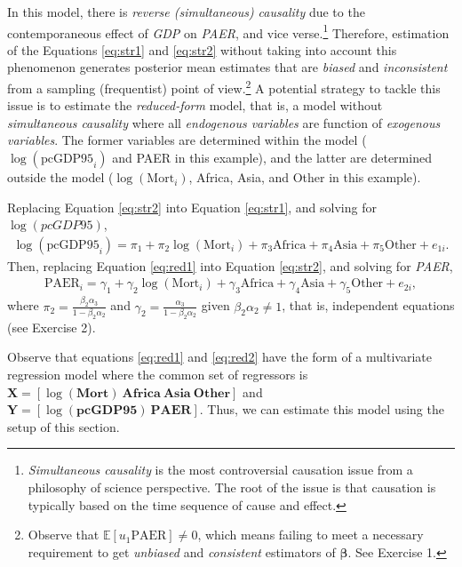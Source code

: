 In this model, there is \textit{reverse (simultaneous) causality} due to the contemporaneous effect of \textit{GDP} on \textit{PAER}, and vice verse.\footnote{\textit{Simultaneous causality} is the most controversial causation issue from a philosophy of science perspective. The root of the issue is that causation is typically based on the time sequence of cause and effect.} Therefore, estimation of the Equations \ref{eq:str1} and \ref{eq:str2} without taking into account this phenomenon generates posterior mean estimates that are \textit{biased} and \textit{inconsistent} from a sampling (frequentist) point of view.\footnote{Observe that $\mathbb{E}[u_1\text{PAER}]\neq 0$, which means failing to meet a necessary requirement to get \textit{unbiased} and \textit{consistent} estimators of $\bm{\beta}$. See Exercise 1.} A potential strategy to tackle this issue is to estimate the \textit{reduced-form} model, that is, a model without \textit{simultaneous causality} where all \textit{endogenous variables} are function of \textit{exogenous variables}. The former variables are determined within the model ($\log(\text{pcGDP95}_i)$ and PAER in this example), and the latter are determined outside the model ($\log(\text{Mort}_i)$, Africa, Asia, and Other in this example).

Replacing Equation \ref{eq:str2} into Equation \ref{eq:str1}, and solving for $\log(\textit{pcGDP95})$,
\begin{align}\label{eq:red1}
	\log(\text{pcGDP95}_i)=\pi_1+\pi_2\log(\text{Mort}_i)+\pi_3 \text{Africa}+\pi_4 \text{Asia}+\pi_5 \text{Other}+e_{1i}.   
\end{align}
Then, replacing Equation \ref{eq:red1} into Equation \ref{eq:str2}, and solving for \textit{PAER},
\begin{align}\label{eq:red2}
	\text{PAER}_i=\gamma_1+\gamma_2\log(\text{Mort}_i)+\gamma_3 \text{Africa}+\gamma_4 \text{Asia}+\gamma_5 \text{Other}+e_{2i},
\end{align}
where $\pi_2=\frac{\beta_2\alpha_3}{1-\beta_2\alpha_2}$ and $\gamma_2=\frac{\alpha_3}{1-\beta_2\alpha_2}$ given $\beta_2\alpha_2\neq 1$, that is, independent equations (see Exercise 2). 

Observe that equations \ref{eq:red1} and \ref{eq:red2} have the form of a multivariate regression model where the common set of regressors is $\bm{X}=\left[\log(\textbf{Mort}) \ \textbf{Africa} \ \textbf{Asia} \ \textbf{Other}\right]$ and $\bm{Y}=\left[\log(\textbf{pcGDP95}) \ \textbf{PAER}\right]$. Thus, we can estimate this model using the setup of this section.

